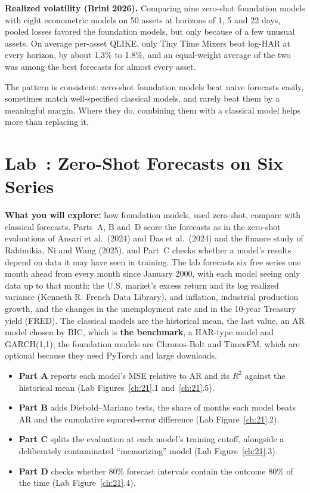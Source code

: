 \textbf{Realized volatility (Brini 2026).} Comparing nine zero-shot foundation models with eight econometric models on 50 assets at horizons of 1, 5 and 22 days, pooled losses favored the foundation models, but only because of a few unusual assets. On average per-asset QLIKE, only Tiny Time Mixers beat log-HAR at every horizon, by about 1.3\% to 1.8\%, and an equal-weight average of the two was among the best forecasts for almost every asset.

The pattern is consistent: zero-shot foundation models beat naive forecasts easily, sometimes match well-specified classical models, and rarely beat them by a meaningful margin. Where they do, combining them with a classical model helps more than replacing it.

\section{Lab~\thechapter: Zero-Shot Forecasts on Six Series}
\label{sec:21-lab}

\textbf{What you will explore:} how foundation models, used zero-shot, compare with classical forecasts. Parts~A, B and~D score the forecasts as in the zero-shot evaluations of Ansari et al.\ (2024) and Das et al.\ (2024) and the finance study of Rahimikia, Ni and Wang (2025), and Part~C checks whether a model's results depend on data it may have seen in training. The lab forecasts six free series one month ahead from every month since January 2000, with each model seeing only data up to that month: the U.S. market's excess return and its log realized variance (Kenneth R. French Data Library), and inflation, industrial production growth, and the changes in the unemployment rate and in the 10-year Treasury yield (FRED). The classical models are the historical mean, the last value, an AR model chosen by BIC, which is \textbf{the benchmark}, a HAR-type model and GARCH(1,1); the foundation models are Chronos-Bolt and TimesFM, which are optional because they need PyTorch and large downloads.

\begin{itemize}
  \item \textbf{Part A} reports each model's MSE relative to AR and its $R^2$ against the historical mean (Lab Figures~\ref{ch:21}.1 and~\ref{ch:21}.5).
  \item \textbf{Part B} adds Diebold--Mariano tests, the share of months each model beats AR and the cumulative squared-error difference (Lab Figure~\ref{ch:21}.2).
  \item \textbf{Part C} splits the evaluation at each model's training cutoff, alongside a deliberately contaminated ``memorizing'' model (Lab Figure~\ref{ch:21}.3).
  \item \textbf{Part D} checks whether 80\% forecast intervals contain the outcome 80\% of the time (Lab Figure~\ref{ch:21}.4).
\end{itemize}

